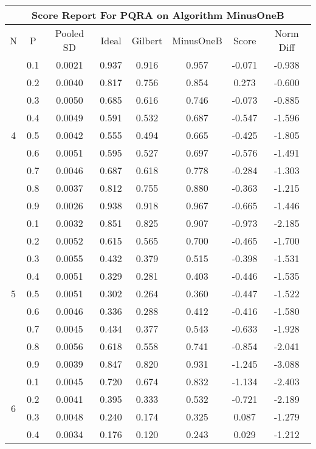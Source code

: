 \documentclass[11pt,a4paper]{report}
\begin{document}
\begin{longtable}{ | c | c || c | c | c | c | c | c | }
\hline
\multicolumn{8}{|c|}{ Score Report For PQRA on Algorithm MinusOneB} \\
\hline
N & P & Pooled SD &  Ideal &  Gilbert & MinusOneB  & Score & Norm Diff \\
 \hline
 \hline
 \endhead
\multirow{9}{*}{4} & 0.1 & 0.0021 & 0.937 & 0.916 & 0.957 & -0.071 & -0.938 \\
 & 0.2 & 0.0040 & 0.817 & 0.756 & 0.854 & 0.273 & -0.600 \\
 & 0.3 & 0.0050 & 0.685 & 0.616 & 0.746 & -0.073 & -0.885 \\
 & 0.4 & 0.0049 & 0.591 & 0.532 & 0.687 & -0.547 & -1.596 \\
 & 0.5 & 0.0042 & 0.555 & 0.494 & 0.665 & -0.425 & -1.805 \\
 & 0.6 & 0.0051 & 0.595 & 0.527 & 0.697 & -0.576 & -1.491 \\
 & 0.7 & 0.0046 & 0.687 & 0.618 & 0.778 & -0.284 & -1.303 \\
 & 0.8 & 0.0037 & 0.812 & 0.755 & 0.880 & -0.363 & -1.215 \\
 & 0.9 & 0.0026 & 0.938 & 0.918 & 0.967 & -0.665 & -1.446 \\
 \hline
\multirow{9}{*}{5} & 0.1 & 0.0032 & 0.851 & 0.825 & 0.907 & -0.973 & -2.185 \\
 & 0.2 & 0.0052 & 0.615 & 0.565 & 0.700 & -0.465 & -1.700 \\
 & 0.3 & 0.0055 & 0.432 & 0.379 & 0.515 & -0.398 & -1.531 \\
 & 0.4 & 0.0051 & 0.329 & 0.281 & 0.403 & -0.446 & -1.535 \\
 & 0.5 & 0.0051 & 0.302 & 0.264 & 0.360 & -0.447 & -1.522 \\
 & 0.6 & 0.0046 & 0.336 & 0.288 & 0.412 & -0.416 & -1.580 \\
 & 0.7 & 0.0045 & 0.434 & 0.377 & 0.543 & -0.633 & -1.928 \\
 & 0.8 & 0.0056 & 0.618 & 0.558 & 0.741 & -0.854 & -2.041 \\
 & 0.9 & 0.0039 & 0.847 & 0.820 & 0.931 & -1.245 & -3.088 \\
 \hline
\multirow{9}{*}{6} & 0.1 & 0.0045 & 0.720 & 0.674 & 0.832 & -1.134 & -2.403 \\
 & 0.2 & 0.0041 & 0.395 & 0.333 & 0.532 & -0.721 & -2.189 \\
 & 0.3 & 0.0048 & 0.240 & 0.174 & 0.325 & 0.087 & -1.279 \\
 & 0.4 & 0.0034 & 0.176 & 0.120 & 0.243 & 0.029 & -1.212 \\

\end{longtable}
\end{document}
